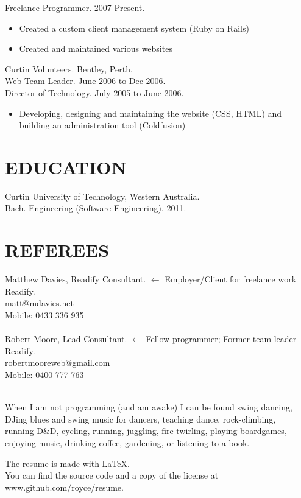 \documentclass[margin]{res}
\begin{document}
\begin{resume}
  Freelance Programmer. 2007-Present.
  \begin{itemize}
    \item Created a custom client management system (Ruby on Rails)
    \item Created and maintained various websites
  \end{itemize} 
  
  Curtin Volunteers. Bentley, Perth. \\
  Web Team Leader.  June 2006 to Dec 2006.\\
  Director of Technology.  July 2005 to June 2006.
  \begin{itemize}
    \item Developing, designing and maintaining the website (CSS, HTML) and building an administration tool (Coldfusion)
  \end{itemize} 

  \section{EDUCATION}
  Curtin University of Technology, Western Australia. \\
  Bach. Engineering (Software Engineering). 2011.

  \section{REFEREES}
  Matthew Davies, Readify Consultant.
  \hfill $\longleftarrow$ Employer/Client for freelance work\\
  Readify. \\
  matt@mdavies.net  \\
  Mobile: 0433 336 935 \\
  \\
  Robert Moore, Lead Consultant.
  \hfill $\longleftarrow$ Fellow programmer; Former team leader\\
  Readify. \\
  robertmooreweb@gmail.com \\
  Mobile: 0400 777 763 \\
  \\

\end{resume} 

\vfill
\centering

\hspace{-1.75in}  When I am not programming (and am awake) I can be found swing dancing, \\
\hspace{-1.75in}  DJing blues and swing music for dancers, teaching dance, rock-climbing,\\
\hspace{-1.75in}  running D\&D, cycling, running, juggling, fire twirling, playing boardgames,\\
\hspace{-1.75in}  enjoying music, drinking coffee, gardening, or listening to a book.

\vfill
\hspace{-1.75in}  The resume is made with \LaTeX. \\
\hspace{-1.75in}  You can find the source code and a copy of the license
                  at www.github.com/royce/resume.
\end{document}
